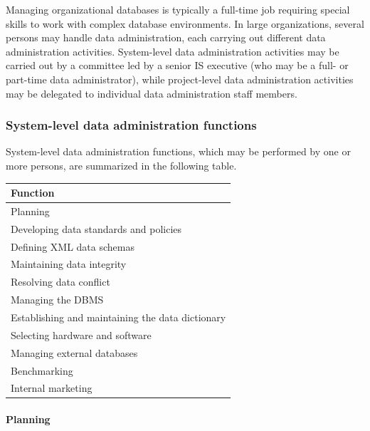 \documentclass[
]{article}
\begin{document}
Managing organizational databases is typically a full-time job requiring
special skills to work with complex database environments. In large
organizations, several persons may handle data administration, each
carrying out different data administration activities. System-level data
administration activities may be carried out by a committee led by a
senior IS executive (who may be a full- or part-time data
administrator), while project-level data administration activities may
be delegated to individual data administration staff members.

\hypertarget{system-level-data-administration-functions}{%
\subsubsection*{System-level data administration functions}\label{system-level-data-administration-functions}}

System-level data administration functions, which may be performed by
one or more persons, are summarized in the following table.

\begin{longtable}[]{@{}l@{}}
\toprule
Function \\
\midrule
\endhead
Planning \\
Developing data standards and policies \\
Defining XML data schemas \\
Maintaining data integrity \\
Resolving data conflict \\
Managing the DBMS \\
Establishing and maintaining the data dictionary \\
Selecting hardware and software \\
Managing external databases \\
Benchmarking \\
Internal marketing \\
\bottomrule
\end{longtable}

\hypertarget{planning-1}{%
\paragraph*{Planning}\label{planning-1}}
\end{document}
